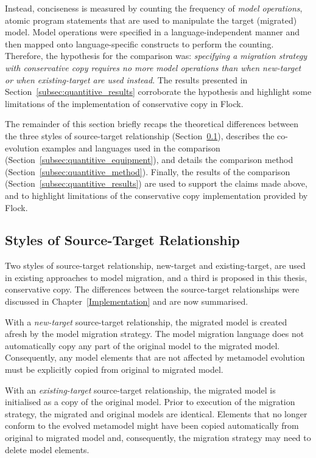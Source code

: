 Instead, conciseness is measured by counting the frequency of \emph{model operations}, atomic program statements that are used to manipulate the target (migrated) model. Model operations were specified in a language-independent manner and then mapped onto language-specific constructs to perform the counting. Therefore, the hypothesis for the comparison was: \emph{specifying a migration strategy with conservative copy requires no more model operations than when new-target or when existing-target are used instead}. The results presented in Section~\ref{subsec:quantitive_results} corroborate the hypothesis and highlight some limitations of the implementation of conservative copy in Flock.

The remainder of this section briefly recaps the theoretical differences between the three styles of source-target relationship (Section~\ref{subsec:styles_of_source-target_relationship}), describes the co-evolution examples and languages used in the comparison (Section~\ref{subsec:quantitive_equipment}), and details the comparison method (Section~\ref{subsec:quantitive_method}). Finally, the results of the comparison (Section~\ref{subsec:quantitive_results}) are used to support the claims made above, and to highlight limitations of the conservative copy implementation provided by Flock.


\subsection{Styles of Source-Target Relationship}
\label{subsec:styles_of_source-target_relationship}
Two styles of source-target relationship, new-target and existing-target, are used in existing approaches to model migration, and a third is proposed in this thesis, conservative copy. The differences between the source-target relationships were discussed in Chapter~\ref{Implementation} and are now summarised.

With a \emph{new-target} source-target relationship, the migrated model is created afresh by the model migration strategy. The model migration language does not automatically copy any part of the original model to the migrated model. Consequently, any model elements that are not affected by metamodel evolution must be explicitly copied from original to migrated model.

With an \emph{existing-target} source-target relationship, the migrated model is initialised as a copy of the original model. Prior to execution of the migration strategy, the migrated and original models are identical. Elements that no longer conform to the evolved metamodel might have been copied automatically from original to migrated model and, consequently, the migration strategy may need to delete model elements.

